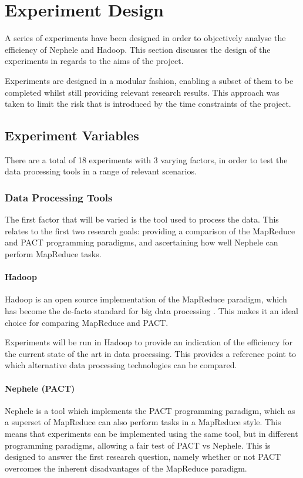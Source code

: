 \chapter{Experiment Design}
A series of experiments have been designed in order to objectively analyse the efficiency of Nephele and Hadoop. This section discusses the design of the experiments in regards to the aims of the project.

Experiments are designed in a modular fashion, enabling a subset of them to be completed whilst still providing relevant research results. This approach was taken to limit the risk that is introduced by the time constraints of the project. 

\section{Experiment Variables}
There are a total of 18 experiments with 3 varying factors, in order to test the data processing tools in a range of relevant scenarios. 

\subsection{Data Processing Tools}
The first factor that will be varied is the tool used to process the data. This relates to the first two research goals: providing a comparison of the MapReduce and PACT programming paradigms, and ascertaining how well Nephele can perform MapReduce tasks.

\subsubsection{Hadoop}
Hadoop is an open source implementation of the MapReduce paradigm, which has become the de-facto standard for big data processing \cite{qin2013reflection}. This makes it an ideal choice for comparing MapReduce and PACT.

Experiments will be run in Hadoop to provide an indication of the efficiency for the current state of the art in data processing. This provides a reference point to which alternative data processing technologies can be compared. 

\subsubsection{Nephele (PACT)}
Nephele is a tool which implements the PACT programming paradigm, which as a superset of MapReduce can also perform tasks in a MapReduce style. This means that experiments can be implemented using the same tool, but in different programming paradigms, allowing a fair test of PACT vs Nephele. This is designed to answer the first research question, namely whether or not PACT overcomes the inherent disadvantages of the MapReduce paradigm.

